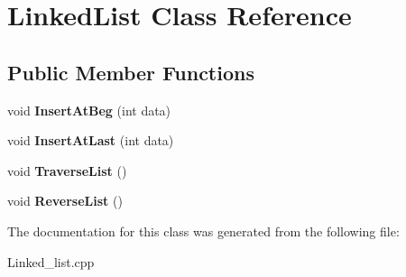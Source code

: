 \hypertarget{classLinkedList}{}\section{Linked\+List Class Reference}
\label{classLinkedList}
\subsection*{Public Member Functions}
\begin{DoxyCompactItemize}
\item 
void {\bfseries Insert\+At\+Beg} (int data)\hypertarget{classLinkedList_a46c4e0347193785131088fd6ccf3744b}{}\label{classLinkedList_a46c4e0347193785131088fd6ccf3744b}

\item 
void {\bfseries Insert\+At\+Last} (int data)\hypertarget{classLinkedList_ae349eae3946d012e29bef037e170d4e1}{}\label{classLinkedList_ae349eae3946d012e29bef037e170d4e1}

\item 
void {\bfseries Traverse\+List} ()\hypertarget{classLinkedList_acd529a10d0c43c094b319048bab0e32a}{}\label{classLinkedList_acd529a10d0c43c094b319048bab0e32a}

\item 
void {\bfseries Reverse\+List} ()\hypertarget{classLinkedList_a20b800788b7350ec259ecff97c85d867}{}\label{classLinkedList_a20b800788b7350ec259ecff97c85d867}

\end{DoxyCompactItemize}


The documentation for this class was generated from the following file\+:\begin{DoxyCompactItemize}
\item 
Linked\+\_\+list.\+cpp\end{DoxyCompactItemize}
